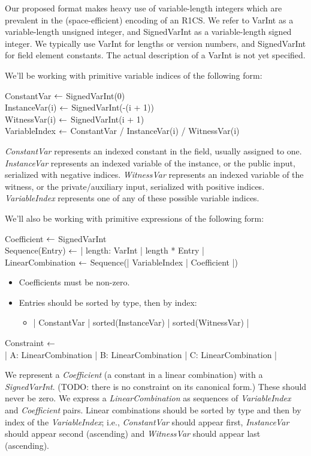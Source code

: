 Our proposed format makes heavy use of variable-length integers which are prevalent in the (space-efficient) encoding of an R1CS. 
We refer to VarInt as a variable-length unsigned integer, and SignedVarInt as a variable-length signed integer. 
We typically use VarInt for lengths or version numbers, and SignedVarInt for field element constants. 
The actual description of a VarInt is not yet specified.

We’ll be working with primitive variable indices of the following form:

{\ttfamily
ConstantVar $\shortleftarrow$  SignedVarInt(0)\\
InstanceVar(i) $\shortleftarrow$  SignedVarInt(-(i + 1))\\
WitnessVar(i) $\shortleftarrow$  SignedVarInt(i + 1)\\
VariableIndex $\shortleftarrow$ ConstantVar / InstanceVar(i) / WitnessVar(i)
}

\emph{ConstantVar} represents an indexed constant in the field, usually assigned to one. 
\emph{InstanceVar} represents an indexed variable of the instance, or the public input, serialized with negative indices. 
\emph{WitnessVar} represents an indexed variable of the witness, or the private/auxiliary input, serialized with positive indices. 
\emph{VariableIndex} represents one of any of these possible variable indices.

We’ll also be working with primitive expressions of the following form:

{\ttfamily
Coefficient $\shortleftarrow$ SignedVarInt \\
Sequence(Entry) $\shortleftarrow$  | length: VarInt | length * Entry | \\
LinearCombination $\shortleftarrow$  Sequence(| VariableIndex | Coefficient |)
}
\begin{itemize}
    \item Coefficients must be non-zero.
    \item Entries should be sorted by type, then by index:
		\begin{itemize}
        \item | ConstantVar | sorted(InstanceVar) | sorted(WitnessVar) |
		\end{itemize}
\end{itemize}

{\ttfamily
Constraint $\shortleftarrow$  \\
| A: LinearCombination | B: LinearCombination | C: LinearCombination |
}

We represent a \emph{Coefficient} (a constant in a linear combination) with a \emph{SignedVarInt}. 
(TODO: there is no constraint on its canonical form.) These should never be zero. 
We express a \emph{LinearCombination} as sequences of \emph{VariableIndex} and \emph{Coefficient} pairs. 
Linear combinations should be sorted by type and then by index of the \emph{VariableIndex}; 
i.e., \emph{ConstantVar} should appear first, \emph{InstanceVar} should appear second (ascending) and \emph{WitnessVar} should appear last (ascending).

